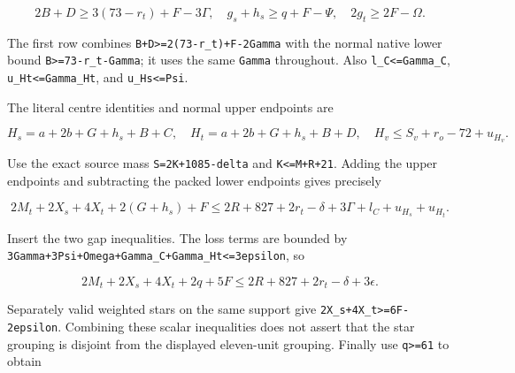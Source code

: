 \documentclass[10pt,a4paper]{article}
\theoremstyle{definition}
\begin{document}
\[
 2B+\allowbreak{}D\ge3(73-r_t)+\allowbreak{}F-3\Gamma,\allowbreak{}
 \quad g_s+\allowbreak{}h_s\ge q+\allowbreak{}F-\Psi,\allowbreak{}
 \quad2g_t\ge2F-\Omega.
\]

The first row combines
\texttt{B+\allowbreak{}D>=\allowbreak{}2(73-r\_\allowbreak{}\allowbreak{}t)+\allowbreak{}F-2Gamma} with the normal
native lower bound \texttt{B>=\allowbreak{}73-r\_\allowbreak{}\allowbreak{}t-Gamma}; it uses
the same \texttt{Gamma} throughout. Also
\texttt{l\_\allowbreak{}\allowbreak{}C<=\allowbreak{}Gamma\_\allowbreak{}\allowbreak{}C},\allowbreak{}
\texttt{u\_\allowbreak{}\allowbreak{}Ht<=\allowbreak{}Gamma\_\allowbreak{}\allowbreak{}Ht},\allowbreak{} and
\texttt{u\_\allowbreak{}\allowbreak{}Hs<=\allowbreak{}Psi}.

The literal centre identities and normal upper endpoints are

\[
 H_s=\allowbreak{}a+\allowbreak{}2b+\allowbreak{}G+\allowbreak{}h_s+\allowbreak{}B+\allowbreak{}C,\allowbreak{}\quad
 H_t=\allowbreak{}a+\allowbreak{}2b+\allowbreak{}G+\allowbreak{}h_s+\allowbreak{}B+\allowbreak{}D,\allowbreak{}
 \quad H_v\le S_v+\allowbreak{}r_o-72+\allowbreak{}u_{H_v}.
\]

Use the exact source mass \texttt{S=\allowbreak{}2K+\allowbreak{}1085-delta} and
\texttt{K<=\allowbreak{}M+\allowbreak{}R+\allowbreak{}21}. Adding the upper endpoints and
subtracting the packed lower endpoints gives precisely

\[
 2M_t+\allowbreak{}2X_s+\allowbreak{}4X_t+\allowbreak{}2(G+\allowbreak{}h_s)+\allowbreak{}F
 \le2R+\allowbreak{}827+\allowbreak{}2r_t-\delta+\allowbreak{}3\Gamma+\allowbreak{}l_C+\allowbreak{}u_{H_s}+\allowbreak{}u_{H_t}.
\]

Insert the two gap inequalities. The loss terms are bounded by
\texttt{3Gamma+\allowbreak{}3Psi+\allowbreak{}Omega+\allowbreak{}Gamma\_\allowbreak{}\allowbreak{}C+\allowbreak{}Gamma\_\allowbreak{}\allowbreak{}Ht<=\allowbreak{}3epsilon},\allowbreak{}
so

\[
 2M_t+\allowbreak{}2X_s+\allowbreak{}4X_t+\allowbreak{}2q+\allowbreak{}5F
 \le2R+\allowbreak{}827+\allowbreak{}2r_t-\delta+\allowbreak{}3\epsilon.
\]

Separately valid weighted stars on the same support give
\texttt{2X\_\allowbreak{}\allowbreak{}s+\allowbreak{}4X\_\allowbreak{}\allowbreak{}t>=\allowbreak{}6F-2epsilon}. Combining these
scalar inequalities does not assert that the star grouping is disjoint
from the displayed eleven-unit grouping. Finally use
\texttt{q>=\allowbreak{}61} to obtain
\end{document}
